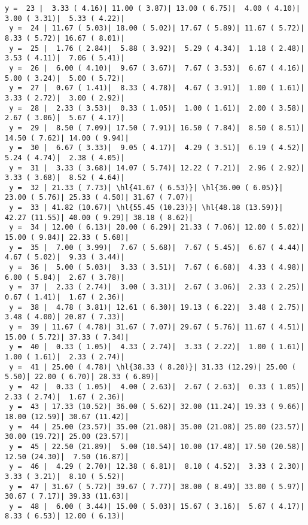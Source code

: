\documentclass[10pt]{article}
\newcommand{\hl}[1]{\textcolor{blue}{#1}}
\begin{document}
\begin{Verbatim}[fontsize=\small, commandchars=\\\{\}]
 y =  23 |  3.33 ( 4.16)| 11.00 ( 3.87)| 13.00 ( 6.75)|  4.00 ( 4.10)|  3.00 ( 3.31)|  5.33 ( 4.22)|
 y =  24 | 11.67 ( 5.03)| 18.00 ( 5.02)| 17.67 ( 5.89)| 11.67 ( 5.72)|  8.33 ( 5.72)| 16.67 ( 8.01)|
 y =  25 |  1.76 ( 2.84)|  5.88 ( 3.92)|  5.29 ( 4.34)|  1.18 ( 2.48)|  3.53 ( 4.11)|  7.06 ( 5.41)|
 y =  26 |  6.00 ( 4.10)|  9.67 ( 3.67)|  7.67 ( 3.53)|  6.67 ( 4.16)|  5.00 ( 3.24)|  5.00 ( 5.72)|
 y =  27 |  0.67 ( 1.41)|  8.33 ( 4.78)|  4.67 ( 3.91)|  1.00 ( 1.61)|  3.33 ( 2.72)|  3.00 ( 2.92)|
 y =  28 |  2.33 ( 3.53)|  0.33 ( 1.05)|  1.00 ( 1.61)|  2.00 ( 3.58)|  2.67 ( 3.06)|  5.67 ( 4.17)|
 y =  29 |  8.50 ( 7.09)| 17.50 ( 7.91)| 16.50 ( 7.84)|  8.50 ( 8.51)| 14.50 ( 7.62)| 14.00 ( 9.94)|
 y =  30 |  6.67 ( 3.33)|  9.05 ( 4.17)|  4.29 ( 3.51)|  6.19 ( 4.52)|  5.24 ( 4.74)|  2.38 ( 4.05)|
 y =  31 |  3.33 ( 3.68)| 14.07 ( 5.74)| 12.22 ( 7.21)|  2.96 ( 2.92)|  3.33 ( 3.68)|  8.52 ( 4.64)|
 y =  32 | 21.33 ( 7.73)| \hl{41.67 ( 6.53)}| \hl{36.00 ( 6.05)}| 23.00 ( 5.76)| 25.33 ( 4.50)| 31.67 ( 7.07)|
 y =  33 | 41.82 (10.67)| \hl{55.45 (10.23)}| \hl{48.18 (13.59)}| 42.27 (11.55)| 40.00 ( 9.29)| 38.18 ( 8.62)|
 y =  34 | 12.00 ( 6.13)| 20.00 ( 6.29)| 21.33 ( 7.06)| 12.00 ( 5.02)| 15.00 ( 9.84)| 22.33 ( 5.68)|
 y =  35 |  7.00 ( 3.99)|  7.67 ( 5.68)|  7.67 ( 5.45)|  6.67 ( 4.44)|  4.67 ( 5.02)|  9.33 ( 3.44)|
 y =  36 |  5.00 ( 5.03)|  3.33 ( 3.51)|  7.67 ( 6.68)|  4.33 ( 4.98)|  6.00 ( 5.84)|  2.67 ( 3.78)|
 y =  37 |  2.33 ( 2.74)|  3.00 ( 3.31)|  2.67 ( 3.06)|  2.33 ( 2.25)|  0.67 ( 1.41)|  1.67 ( 2.36)|
 y =  38 |  4.78 ( 3.81)| 12.61 ( 6.30)| 19.13 ( 6.22)|  3.48 ( 2.75)|  3.48 ( 4.00)| 20.87 ( 7.33)|
 y =  39 | 11.67 ( 4.78)| 31.67 ( 7.07)| 29.67 ( 5.76)| 11.67 ( 4.51)| 15.00 ( 5.72)| 37.33 ( 7.34)|
 y =  40 |  0.33 ( 1.05)|  4.33 ( 2.74)|  3.33 ( 2.22)|  1.00 ( 1.61)|  1.00 ( 1.61)|  2.33 ( 2.74)|
 y =  41 | 25.00 ( 4.78)| \hl{38.33 ( 8.20)}| 31.33 (12.29)| 25.00 ( 5.50)| 22.00 ( 6.70)| 28.33 ( 6.89)|
 y =  42 |  0.33 ( 1.05)|  4.00 ( 2.63)|  2.67 ( 2.63)|  0.33 ( 1.05)|  2.33 ( 2.74)|  1.67 ( 2.36)|
 y =  43 | 17.33 (10.52)| 36.00 ( 5.62)| 32.00 (11.24)| 19.33 ( 9.66)| 18.00 (12.59)| 30.67 (11.42)|
 y =  44 | 25.00 (23.57)| 35.00 (21.08)| 35.00 (21.08)| 25.00 (23.57)| 30.00 (19.72)| 25.00 (23.57)|
 y =  45 | 22.50 (21.89)|  5.00 (10.54)| 10.00 (17.48)| 17.50 (20.58)| 12.50 (24.30)|  7.50 (16.87)|
 y =  46 |  4.29 ( 2.70)| 12.38 ( 6.81)|  8.10 ( 4.52)|  3.33 ( 2.30)|  3.33 ( 3.21)|  8.10 ( 5.52)|
 y =  47 | 31.67 ( 5.72)| 39.67 ( 7.77)| 38.00 ( 8.49)| 33.00 ( 5.97)| 30.67 ( 7.17)| 39.33 (11.63)|
 y =  48 |  6.00 ( 3.44)| 15.00 ( 5.03)| 15.67 ( 3.16)|  5.67 ( 4.17)|  8.33 ( 6.53)| 12.00 ( 6.13)|

\end{Verbatim}
\end{document}
